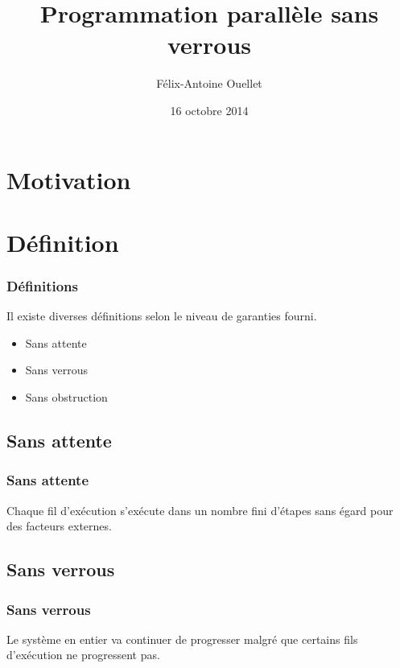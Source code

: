 \documentclass{beamer}
\author[Félix-Antoine Ouellet]{Félix-Antoine Ouellet}
\title[Lock-free\hspace{2em}\insertframenumber/\inserttotalframenumber]{Programmation parallèle sans verrous}
\institute{Université de Sherbrooke}
\date{16 octobre 2014}
\begin{document}
\begin{frame}
\titlepage %
\end{frame}

\begin{frame}
\tableofcontents[hideallsubsections]
\end{frame}

\section{Motivation}

\section{Définition}
\begin{frame}
\frametitle{Définitions}
Il existe diverses définitions selon le niveau de garanties fourni.
\begin{itemize}
\item Sans attente
\item Sans verrous
\item Sans obstruction
\end{itemize}
\end{frame}


\subsection{Sans attente}
\begin{frame}[fragile]
\frametitle{Sans attente}
Chaque fil d'exécution s'exécute dans un nombre fini d'étapes sans égard pour des facteurs externes.

\end{frame}


\subsection{Sans verrous}
\begin{frame}[fragile]
\frametitle{Sans verrous}
Le système en entier va continuer de progresser malgré que certains fils d'exécution ne progressent pas.

\end{frame}
\end{document}
